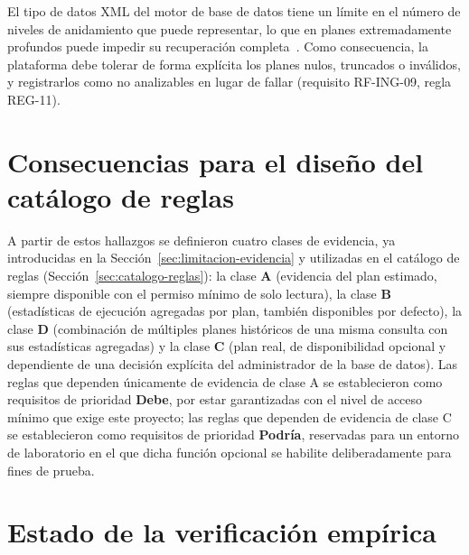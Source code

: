\documentclass[11pt,a4paper]{report}
\begin{document}
\begin{description}[leftmargin=1.6cm,style=nextline]
\item[Hallazgo F8 -- No todo plan es recuperable como XML v\'alido.] El tipo de datos XML del motor de base de datos tiene un l\'imite en el n\'umero de niveles de anidamiento que puede representar, lo que en planes extremadamente profundos puede impedir su recuperaci\'on completa~\cite{R7}. Como consecuencia, la plataforma debe tolerar de forma expl\'icita los planes nulos, truncados o inv\'alidos, y registrarlos como no analizables en lugar de fallar (requisito RF-ING-09, regla REG-11).

\end{description}

\section{Consecuencias para el dise\~no del cat\'alogo de reglas}

A partir de estos hallazgos se definieron cuatro clases de evidencia, ya introducidas en la Secci\'on~\ref{sec:limitacion-evidencia} y utilizadas en el cat\'alogo de reglas (Secci\'on~\ref{sec:catalogo-reglas}): la clase \textbf{A} (evidencia del plan estimado, siempre disponible con el permiso m\'inimo de solo lectura), la clase \textbf{B} (estad\'isticas de ejecuci\'on agregadas por plan, tambi\'en disponibles por defecto), la clase \textbf{D} (combinaci\'on de m\'ultiples planes hist\'oricos de una misma consulta con sus estad\'isticas agregadas) y la clase \textbf{C} (plan real, de disponibilidad opcional y dependiente de una decisi\'on expl\'icita del administrador de la base de datos). Las reglas que dependen \'unicamente de evidencia de clase A se establecieron como requisitos de prioridad \textbf{Debe}, por estar garantizadas con el nivel de acceso m\'inimo que exige este proyecto; las reglas que dependen de evidencia de clase C se establecieron como requisitos de prioridad \textbf{Podr\'ia}, reservadas para un entorno de laboratorio en el que dicha funci\'on opcional se habilite deliberadamente para fines de prueba.

\section{Estado de la verificaci\'on emp\'irica}
\end{document}
